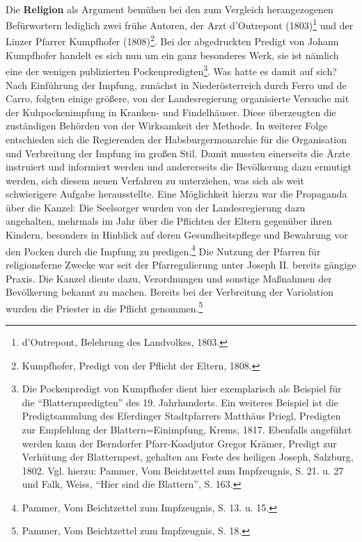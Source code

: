 \documentclass[
    a4paper,
    12pt,
    hyphens,
    chapterprefix=true,
    headheight=33pt,
    footheight=29pt,
    headings=optiontohead, %
]{scrartcl}
\begin{document}
{\\
Die \textbf{Religion} als Argument bemühen bei den zum Vergleich herangezogenen Befürwortern lediglich zwei frühe Autoren, der Arzt d'Outrepont (1803)\footnote{d'Outrepont, Belehrung des Landvolkes, 1803.} und der Linzer Pfarrer Kumpfhofer (1808)\footnote{Kumpfhofer, Predigt von der Pflicht der Eltern, 1808.}. Bei der abgedruckten Predigt von Johann Kumpfhofer handelt es sich nun um ein ganz besonderes Werk, sie ist nämlich eine der wenigen publizierten Pockenpredigten\footnote{Die Pockenpredigt von Kumpfhofer dient hier exemplarisch als Beispiel für die "`Blatternpredigten"' des 19. Jahrhunderts. Ein weiteres Beispiel ist die Predigtsammlung des Eferdinger Stadtpfarrers Matthäus Priegl, Predigten zur Empfehlung der Blattern=Einimpfung, Krems, 1817. Ebenfalls angeführt werden kann der Berndorfer Pfarr-Koadjutor Gregor Krämer, Predigt zur Verhütung der Blatternpest, gehalten am Feste des heiligen Joseph, Salzburg, 1802. Vgl. hierzu: Pammer, Vom Beichtzettel zum Impfzeugnis, S. 21. u. 27 und Falk, Weiss, "`Hier sind die Blattern"', S. 163.}. Was hatte es damit auf sich? Nach Einführung der Impfung, zunächst in Niederösterreich durch Ferro und de Carro, folgten einige größere, von der Landesregierung organisierte Versuche mit der Kuhpockenimpfung in Kranken- und Findelhäuser. Diese überzeugten die zuständigen Behörden von der Wirksamkeit der Methode. In weiterer Folge entschieden sich die Regierenden der Habsburgermonarchie für die Organisation und Verbreitung der Impfung im großen Stil. Damit mussten einerseits die Ärzte instruiert und informiert werden und andererseits die Bevölkerung dazu ermutigt werden, sich diesem neuen Verfahren zu unterziehen, was sich als weit schwierigere Aufgabe herausstellte. Eine Möglichkeit hierzu war die Propaganda über die Kanzel: Die Seelsorger wurden von der Landesregierung dazu angehalten, mehrmals im Jahr über die Pflichten der Eltern gegenüber ihren Kindern, besonders in Hinblick auf deren Gesundheitspflege und Bewahrung vor den Pocken durch die Impfung zu predigen.\footnote{Pammer, Vom Beichtzettel zum Impfzeugnis, S. 13. u. 15.} Die Nutzung der Pfarren für religionsferne Zwecke war seit der Pfarregulierung unter Joseph II. bereits gängige Praxis. Die Kanzel diente dazu, Verordnungen und sonstige Maßnahmen der Bevölkerung bekannt zu machen. Bereits bei der Verbreitung der Variolation wurden die Priester in die Pflicht genommen.\footnote{Pammer, Vom Beichtzettel zum Impfzeugnis, S. 18.}\\
}
\end{document}

